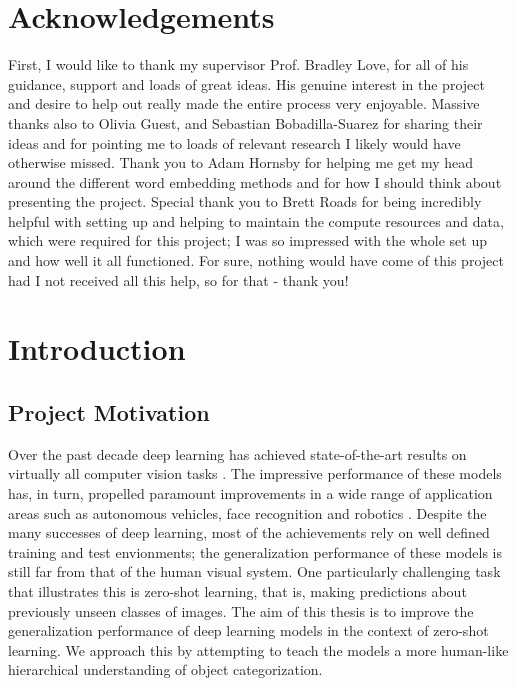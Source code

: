 \documentclass[12pt]{report}
\begin{document}
\chapter*{Acknowledgements}
\thispagestyle{empty}
First, I would like to thank my supervisor Prof. Bradley Love, for all of his guidance, support and loads of great ideas. His genuine interest in the project and desire to help out really made the entire process very enjoyable. Massive thanks also to Olivia Guest, and Sebastian Bobadilla-Suarez for sharing their ideas and for pointing me to loads of relevant research I likely would have otherwise missed. Thank you to Adam Hornsby for helping me get my head around the different word embedding methods and for how I should think about presenting the project. Special thank you to Brett Roads for being incredibly helpful with setting up and helping to maintain the compute resources and data, which were required for this project; I was so impressed with the whole set up and how well it all functioned. For sure, nothing would have come of this project had I not received all this help, so for that - thank you!

\clearpage

\tableofcontents
\listoffigures
\listoftables
\setcounter{page}{1}

\chapter[Introduction]{Introduction\raisebox{.3\baselineskip}{\normalsize\footnotemark}}

\section{Project Motivation}
Over the past decade deep learning has achieved state-of-the-art results on virtually all computer vision tasks \cite{Goodfellow2016}. The impressive performance of these models has, in turn, propelled paramount improvements in a wide range of application areas such as autonomous vehicles\cite{Bojarski2016}, face recognition \cite{Taigman2014} and robotics \cite{Finn2015}\cite{Ganegedara2017}. Despite the many successes of deep learning, most of the achievements rely on well defined training and test envionments; the generalization performance of these models is still far from that of the human visual system. One particularly challenging task that illustrates this is zero-shot learning, that is, making predictions about previously unseen classes of images. The aim of this thesis is to improve the generalization performance of deep learning models in the context of zero-shot learning. We approach this by attempting to teach the models a more human-like hierarchical understanding of object categorization.
\end{document}
